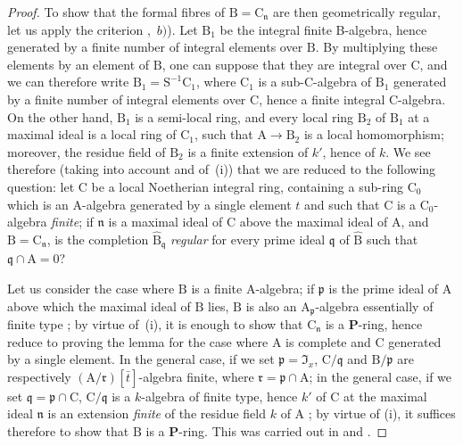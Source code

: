 \begin{proof}
To show that the formal fibres of $\mathrm{B}=\mathrm{C}_\mathfrak{n}$ are then geometrically regular, let us apply the criterion ,~$b)$).
Let $\mathrm{B}_1$ be the integral finite B-algebra, hence generated by a finite number of integral elements over $\mathrm{B}$.
By multiplying these elements by an element of $\mathrm{B}$, one can suppose that they are integral over $\mathrm{C}$, and we can therefore write $\mathrm{B}_1=\mathrm{S}^{-1}\mathrm{C}_1$, where $\mathrm{C}_1$ is a sub-C-algebra of $\mathrm{B}_1$ generated by a finite number of integral elements over $\mathrm{C}$, hence a finite integral C-algebra.
On the other hand, $\mathrm{B}_1$ is a semi-local ring, and every local ring $\mathrm{B}_2$ of $\mathrm{B}_1$ at a maximal ideal is a local ring of $\mathrm{C}_1$, such that $\mathrm{A}\to\mathrm{B}_2$ is a local homomorphism; moreover, the residue field of $\mathrm{B}_2$ is a finite extension of $k'$, hence of $k$.
We see therefore (taking into account  and of~(i)) that we are reduced to the following question: let $\mathrm{C}$ be a local Noetherian integral ring, containing a sub-ring $\mathrm{C}_0$ which is an A-algebra generated by a single element $t$ and such that $\mathrm{C}$ is a $\mathrm{C}_0$-algebra \emph{finite}; if $\mathfrak{n}$ is a maximal ideal of $\mathrm{C}$
above the maximal ideal of $\mathrm{A}$, and $\mathrm{B}=\mathrm{C}_\mathfrak{n}$, is the completion $\widehat{\mathrm{B}}_\mathfrak{q}$ \emph{regular} for every prime ideal $\mathfrak{q}$ of $\widehat{\mathrm{B}}$ such that $\mathfrak{q}\cap\mathrm{A}=0$?

Let us consider the case where $\mathrm{B}$ is a finite A-algebra; if $\mathfrak{p}$ is the prime ideal of $\mathrm{A}$ above which the maximal ideal of $\mathrm{B}$ lies, $\mathrm{B}$ is also an $\mathrm{A}_\mathfrak{p}$-algebra essentially of finite type ; by virtue of~(i), it is enough to show that $\mathrm{C}_\mathfrak{n}$ is a $\boldsymbol{P}$-ring, hence reduce to proving the lemma for the case where $\mathrm{A}$ is complete and $\mathrm{C}$ generated by a single element.
In the general case, if we set $\mathfrak{p}=\mathfrak{I}_x$, $\mathrm{C}/\mathfrak{q}$ and $\mathrm{B}/\mathfrak{p}$ are respectively $(\mathrm{A}/\mathfrak{r})[\bar{t}]$-algebra finite, where $\mathfrak{r}=\mathfrak{p}\cap\mathrm{A}$; in the general case, if we set $\mathfrak{q}=\mathfrak{p}\cap\mathrm{C}$, $\mathrm{C}/\mathfrak{q}$ is a $k$-algebra of finite type, hence $k'$ of $\mathrm{C}$ at the maximal ideal $\mathfrak{n}$ is an extension \emph{finite} of the residue field $k$ of $\mathrm{A}$ ; by virtue of (i), it suffices therefore to show that $\mathrm{B}$ is a $\boldsymbol{P}$-ring.
This was carried out in  and .
\end{proof}

